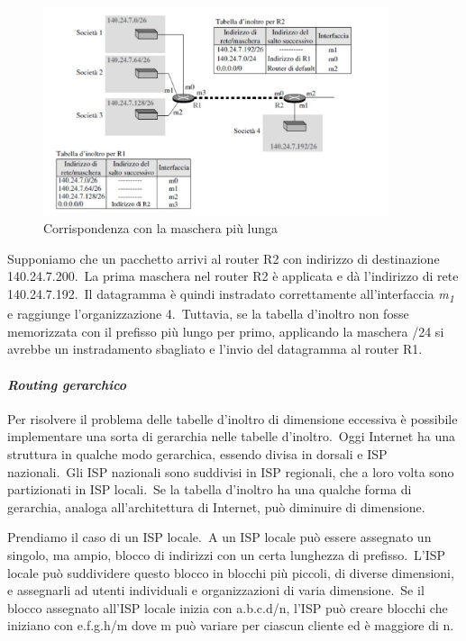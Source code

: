 \begin{figure}[H]
    \centering
    \includegraphics[width=0.9\textwidth]{immagini/Longer_mask.jpg}
    \caption*{Corrispondenza con la maschera più lunga}
\end{figure}

Supponiamo che un pacchetto arrivi al router R2 con indirizzo di destinazione 140.24.7.200.\
La prima maschera nel router R2 è applicata e dà l'indirizzo di rete 140.24.7.192.\
Il datagramma è quindi instradato correttamente all'interfaccia \emph{m\textsubscript{1}} e raggiunge l'organizzazione 4.\
Tuttavia, se la tabella d'inoltro non fosse memorizzata con il prefisso più lungo per primo, applicando la maschera \slash24 si avrebbe un instradamento sbagliato e l'invio del datagramma al router R1.

\paragraph{\emph{Routing gerarchico}}

Per risolvere il problema delle tabelle d'inoltro di dimensione eccessiva è possibile implementare una sorta di gerarchia nelle tabelle d'inoltro.\
Oggi Internet ha una struttura in qualche modo gerarchica, essendo divisa in dorsali e ISP nazionali.\
Gli ISP nazionali sono suddivisi in ISP regionali, che a loro volta sono partizionati in ISP locali.\
Se la tabella d'inoltro ha una qualche forma di gerarchia, analoga all'architettura di Internet, può diminuire di dimensione.

Prendiamo il caso di un ISP locale.\
A un ISP locale può essere assegnato un singolo, ma ampio, blocco di indirizzi con un certa lunghezza di prefisso.\
L'ISP locale può suddividere questo blocco in blocchi più piccoli, di diverse dimensioni, e assegnarli ad utenti individuali e organizzazioni di varia dimensione.\
Se il blocco assegnato all'ISP locale inizia con a.b.c.d/n, l'ISP può creare blocchi che iniziano con e.f.g.h/m dove m può variare per ciascun cliente ed è maggiore di n.

